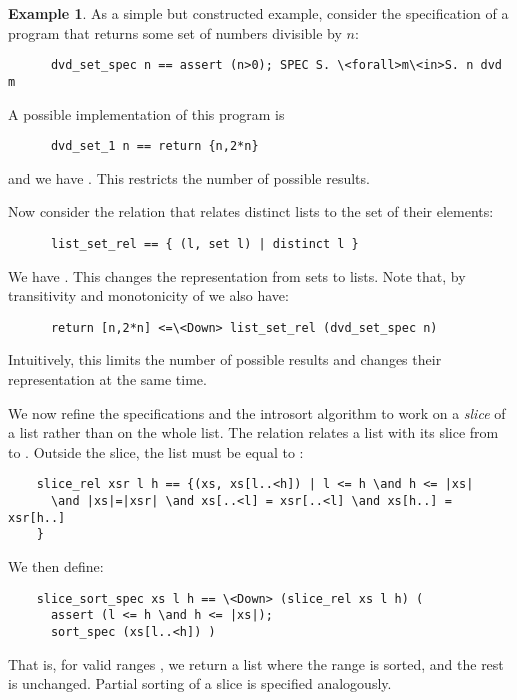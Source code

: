 \documentclass[sigplan,10pt,anonymous,review]{acmart}\settopmatter{printfolios=true,printccs=false,printacmref=false}
\theoremstyle{definition}
\newtheorem{example}{Example}[section]
\begin{document}
  \begin{example}
    As a simple but constructed example, consider the specification of a program that returns some set of numbers divisible by \is$n$:
    \begin{lstlisting}
      dvd_set_spec n == assert (n>0); SPEC S. \<forall>m\<in>S. n dvd m
    \end{lstlisting}

    A possible implementation of this program is
    \begin{lstlisting}
      dvd_set_1 n == return {n,2*n}
    \end{lstlisting}
    and we have . This restricts the number of possible results.

    Now consider the relation  that relates distinct lists to the set of their elements:
    \begin{lstlisting}
      list_set_rel == { (l, set l) | distinct l }
    \end{lstlisting}

    We have . This changes the
    representation from sets to lists. Note that, by transitivity and monotonicity of  we also have:
    \begin{lstlisting}
      return [n,2*n] <=\<Down> list_set_rel (dvd_set_spec n)
    \end{lstlisting}
    Intuitively, this limits the number of possible results and changes their representation at the same time.
  \end{example}

  We now refine the specifications and the introsort algorithm to work on a \emph{slice} of a list rather than on the whole list.
  The relation  relates a list with its slice from  to . Outside the slice, the list must
  be equal to :
  \begin{lstlisting}
    slice_rel xsr l h == {(xs, xs[l..<h]) | l <= h \and h <= |xs|
      \and |xs|=|xsr| \and xs[..<l] = xsr[..<l] \and xs[h..] = xsr[h..]
    }
  \end{lstlisting}
  We then define:
  \begin{lstlisting}
    slice_sort_spec xs l h == \<Down> (slice_rel xs l h) (
      assert (l <= h \and h <= |xs|);
      sort_spec (xs[l..<h]) )
  \end{lstlisting}
  That is, for valid ranges , we return a list where the range is sorted, and the rest is unchanged.
  Partial sorting of a slice is specified analogously.
\end{document}

